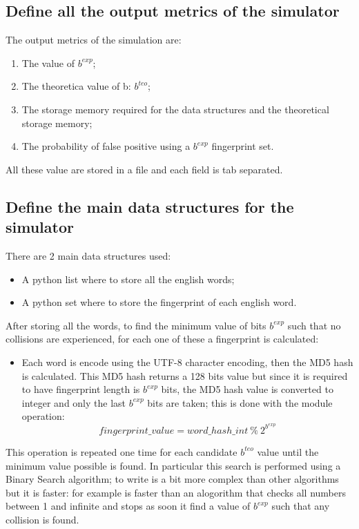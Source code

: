 \documentclass{report}
\begin{document}
				\subsection{Define all the output metrics of the simulator}
					The output metrics of the simulation are:
					\begin{enumerate}
							\item The value of $b^{exp}$;
							\item The theoretica value of b: $b^{teo}$;
							\item The storage  memory required for the data structures and the theoretical storage memory;
							\item The probability of false positive using a  $b^{exp}$ fingerprint set.
					\end{enumerate}
					All these value are stored in a file and each field is tab separated.
			
			\subsection{Define the main data structures for the simulator}
						There are 2 main data structures used: 
							\begin{itemize}
								\item A python list where to store all the english words;
								\item A python set where to store the fingerprint of each english word.
								\end{itemize}
						After storing all the words, to find the minimum value of bits $b^{exp}$ such that no collisions are experienced, for each one of these a fingerprint is calculated:
						\begin{itemize}
								\item[] Each word is encode using the UTF-8 character encoding, then the MD5 hash is calculated. This MD5 hash returns a 128 bits value but since it is required to have fingerprint length is $b^{exp}$ bits, the MD5 hash value is converted to integer and only the last  $b^{exp}$ bits are taken; this is done with the module operation: \[ fingerprint\_value = word\_hash\_int \: \% \: 2^{b^{exp}} \]
						\end{itemize}
						This operation is repeated one time for each candidate $b^{teo}$ value until the minimum value possible is found. In particular this search is performed using a Binary Search algorithm; to write is a bit more complex than other algorithms but it is faster: for example is faster than an alogorithm that checks all numbers between 1 and infinite and stops as soon it find a value of $b^{exp}$ such that any collision is found.
					
\end{document}
